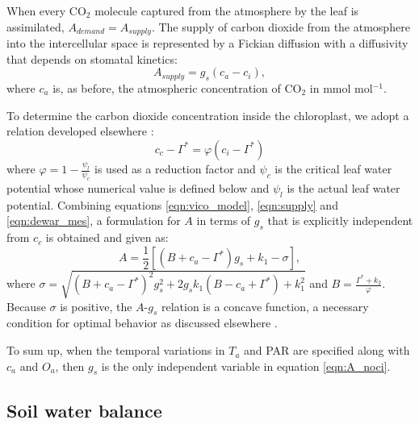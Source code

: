 \documentclass[utf8]{frontiersSCNS} %
\begin{document}
When every CO$_2$ molecule captured from the atmosphere by the leaf is assimilated, $A_{demand} = A_{supply}$. The supply of carbon dioxide from the atmosphere into the intercellular space is represented by a Fickian diffusion  with a diffusivity that depends on stomatal kinetics:
\begin{equation}
    \label{eqn:supply}
    A_{supply} = g_s (c_a - c_i),
\end{equation}
where $c_a$ is, as before, the atmospheric concentration of CO$_2$ in mmol mol$^{-1}$.

To determine the carbon dioxide concentration inside the chloroplast, we adopt a relation developed elsewhere \citep{dewar2018new}:
\begin{equation}
    \label{eqn:dewar_mes}
    c_c - \Gamma^* = \varphi(c_i - \Gamma^*)
\end{equation}
where $\varphi = 1 - \frac{\psi_l}{\psi_c}$ is used as a reduction factor and $\psi_c$ is the critical leaf water potential whose numerical value is defined below and $\psi_l$ is the actual leaf water potential. 
Combining equations \ref{eqn:vico_model}, \ref{eqn:supply} and \ref{eqn:dewar_mes}, a formulation for $A$ in terms of $g_s$ that is explicitly independent from $c_c$ is obtained and given as:
\begin{equation}
    \label{eqn:A_noci}
    A =\frac{1}{2}[(B + c_a - \Gamma^*)g_s + k_1 - \sigma],
\end{equation}
where $\sigma = \sqrt{(B + c_a - \Gamma^*)^2g_s^2 + 2{g_s}{k_1}(B - c_a + \Gamma^*) + k_1^2}$ and $B = \frac{\Gamma^* + k_2}{\varphi}$.  Because $\sigma$ is positive, the $A$-$g_s$ relation is a concave function, a necessary condition for optimal behavior as discussed elsewhere \citep{katul_stomatal_2009}.

To sum up, when the temporal variations in $T_a$ and PAR are specified along with $c_a$ and $O_a$, then $g_s$ is the only independent variable in equation \ref{eqn:A_noci}.

\subsection{Soil water balance}

\end{document}
